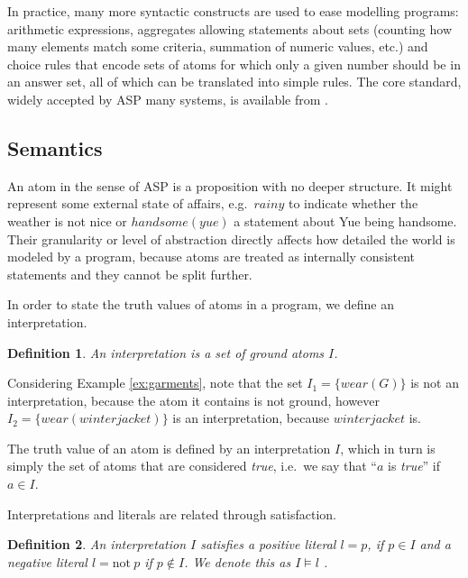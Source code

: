 \documentclass{vutinfth} %
\newtheorem{definition}{Definition}[chapter]
\newcommand{\fail}{\mathrm{not } \ \xspace}
\begin{document}
In practice, many more syntactic constructs are used to ease modelling programs: arithmetic expressions, aggregates allowing statements about sets (counting how many elements match some criteria, summation of numeric values, etc.) and choice rules that encode sets of atoms for which only a given number should be in an answer set, all of which can be translated into simple rules. The core standard, widely accepted by ASP many systems, is available from \cite{calimeri2015asp}.

\subsection{Semantics}

An atom in the sense of ASP is a proposition with no deeper structure. It might represent some external state of affairs, e.g.~$rainy$ to indicate whether the weather is not nice or $handsome(yue)$ a statement about Yue being handsome. Their granularity or level of abstraction directly affects how detailed the world is modeled by a program, because atoms are treated as internally consistent statements and they cannot be split further.

In order to state the truth values of atoms in a program, we define an interpretation.

\begin{definition}
An \emph{interpretation} is a set of ground atoms $I$.
\end{definition}


Considering Example \ref{ex:garments}, note that the set $I_1 = \{ wear(G) \}$ is not an interpretation, because the atom it contains is not ground, however $I_2 = \{ wear(winterjacket) \}$ is an interpretation, because $winterjacket$ is.

The truth value of an atom is defined by an interpretation $I$, which in turn is simply the set of atoms that are considered \emph{true}, i.e.~we say that \enquote{$a$ is \emph{true}} if $a \in I$.

Interpretations and literals are related through satisfaction.

\begin{definition}
An interpretation $I$ \emph{satisfies} a positive literal $l = p$, if $p \in I$ and a negative literal $l = \fail p$ if $p \not \in I$. We denote this as $I \models l$ .
\end{definition}
\end{document}
